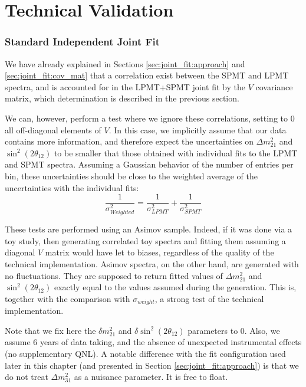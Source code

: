 \documentclass[../main.tex]{subfiles}
\begin{document}
\section{Technical Validation}
\label{sec:joint_fit:validation}

\subsubsection{Standard Independent Joint Fit}


We have already explained in Sections \ref{sec:joint_fit:approach} and \ref{sec:joint_fit:cov_mat} that a correlation exist between the SPMT and LPMT spectra, and is accounted for in the LPMT+SPMT joint fit by the $V$ covariance matrix, which determination is described in the previous section.

We can, however, perform a test where we ignore these correlations, setting to 0 all off-diagonal elements of $V$. In this case, we implicitly assume that our data contains more information, and therefore expect the uncertainties on $\Delta m^2_{21}$ and $\sin^2(2 \theta_{12})$ to be smaller that those obtained with individual fits to the LPMT and SPMT spectra. Assuming a Gaussian behavior of the number of entries per bin, these uncertainties should be close to the weighted average of the uncertainties with the individual fits:
\begin{equation}
  \label{eq:joint_fit:weighted_average}
  \frac{1}{\sigma^2_{Weighted}} = \frac{1}{\sigma^2_{LPMT}} + \frac{1}{\sigma^2_{SPMT}}
\end{equation}

These tests are performed using an Asimov sample. Indeed, if it was done via a toy study, then generating correlated toy spectra and fitting them assuming a diagonal $V$ matrix would have let to biases, regardless of the quality of the technical implementation. Asimov spectra, on the other hand, are generated with no fluctuations. They are supposed to return fitted values of $\Delta m^2_{21}$ and $\sin^2(2 \theta_{12})$ exactly equal to the values assumed during the generation. This is, together with the comparison with $\sigma_{weight}$, a strong test of the technical implementation.

Note that we fix here the $\delta m^2_{21}$ and $\delta \sin^2(2 \theta_{12})$ parameters to 0. Also, we assume 6 years of data taking, and the absence of unexpected instrumental effects (no supplementary QNL). A notable difference with the fit configuration used later in this chapter (and presented in Section \ref{sec:joint_fit:approach}) is that we do not treat $\Delta m^2_{31}$ as a nuisance parameter. It is free to float.
\end{document}
